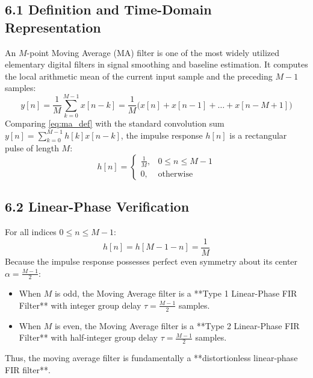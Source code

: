 \documentclass[11pt,a4paper]{article}
\begin{document}
\subsection{6.1 Definition and Time-Domain Representation}
An $M$-point Moving Average (MA) filter is one of the most widely utilized elementary digital filters in signal smoothing and baseline estimation. It computes the local arithmetic mean of the current input sample and the preceding $M-1$ samples:
\begin{equation}
y[n] = \frac{1}{M} \sum_{k=0}^{M-1} x[n-k] = \frac{1}{M}\big(x[n] + x[n-1] + \dots + x[n-M+1]\big)
\label{eq:ma_def}
\end{equation}
Comparing \eqref{eq:ma_def} with the standard convolution sum $y[n] = \sum_{k=0}^{M-1} h[k]x[n-k]$, the impulse response $h[n]$ is a rectangular pulse of length $M$:
\begin{equation}
h[n] = \begin{cases} \frac{1}{M}, & 0 \le n \le M-1 \\ 0, & \text{otherwise} \end{cases}
\end{equation}

\subsection{6.2 Linear-Phase Verification}
For all indices $0 \le n \le M-1$:
\begin{equation}
h[n] = h[M-1-n] = \frac{1}{M}
\end{equation}
Because the impulse response possesses perfect even symmetry about its center $\alpha = \frac{M-1}{2}$:
\begin{itemize}
    \item When $M$ is odd, the Moving Average filter is a **Type 1 Linear-Phase FIR Filter** with integer group delay $\tau = \frac{M-1}{2}$ samples.
    \item When $M$ is even, the Moving Average filter is a **Type 2 Linear-Phase FIR Filter** with half-integer group delay $\tau = \frac{M-1}{2}$ samples.
\end{itemize}
Thus, the moving average filter is fundamentally a **distortionless linear-phase FIR filter**.
\end{document}
